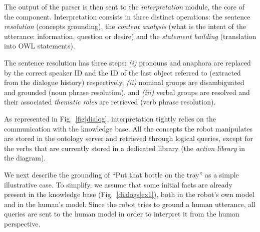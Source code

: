 \documentclass{svmult}
\begin{document}
The output of the parser is then sent to the \emph{interpretation} module, the
core of the component.  Interpretation consists in three distinct operations:
the sentence \emph{resolution} (concepts grounding), the \emph{content
analysis} (what is the intent of the utterance: information, question or
desire) and the \emph{statement building} (translation into OWL statements).

The sentence resolution has three steps: {\it(i)} pronouns and anaphora are
replaced by the correct speaker ID and the ID of the last object referred to
(extracted from the dialogue history) respectively, {\it(ii)} nominal groups are
disambiguated and grounded (noun phrase resolution), and {\it(iii)}
verbal groups are resolved and their associated \emph{thematic roles} are
retrieved (verb phrase resolution).

As represented in Fig.~\ref{fig|dialog}, interpretation tightly relies on the
communication with the knowledge base. All the concepts the robot manipulates
are stored in the ontology server and retrieved through logical
queries, except for the verbs that are currently stored in a dedicated library
(the \emph{action library} in the diagram).

We next describe the grounding of ``Put that bottle on the tray'' as a simple
illustrative case. To simplify, we assume that some initial facts are already
present in the knowledge base (Fig.~\ref{dialogs|ex1}), both in the robot's own
model and in the human's model.  Since the robot tries to ground a human
utterance, all queries are sent to the human model in order to interpret it
from the human perspective. 
\end{document}
